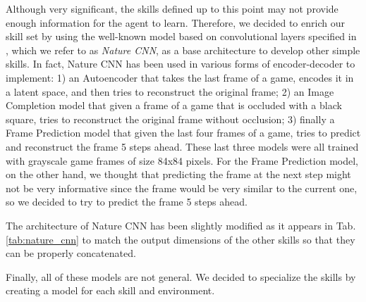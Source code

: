 Although very significant, the skills defined up to this point may not provide enough information for the agent to learn. Therefore, we decided to enrich our skill set by using the well-known model based on convolutional layers specified in \cite{mnih2013playing}, which we refer to as \textit{Nature CNN}, as a base architecture to develop other simple skills.
In fact, Nature CNN has been used in various forms of encoder-decoder to implement: 1) an Autoencoder that takes the last frame of a game, encodes it in a latent space, and then tries to reconstruct the original frame; 2) an Image Completion model that given a frame of a game that is occluded with a black square, tries to reconstruct the original frame without occlusion; 3) finally a Frame Prediction model that given the last four frames of a game, tries to predict and reconstruct the frame 5 steps ahead.
These last three models were all trained with grayscale game frames of size 84x84 pixels. For the Frame Prediction model, on the other hand, we thought that predicting the frame at the next step might not be very informative since the frame would be very similar to the current one, so we decided to try to predict the frame 5 steps ahead.


The architecture of Nature CNN has been slightly modified as it appears in Tab. \ref{tab:nature_cnn} to match the output dimensions of the other skills so that they can be properly concatenated.


Finally, all of these models are not general. We decided to specialize the skills by creating a model for each skill and environment.

